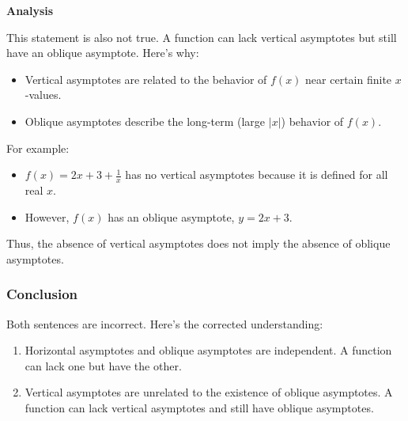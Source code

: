 \documentclass[a4paper,12pt]{article}
\begin{document}
\textbf{Analysis}

This statement is also not true. A function can lack vertical asymptotes but still have an oblique asymptote. Here’s why:
\begin{itemize}
\item 
Vertical asymptotes are related to the behavior of \( f(x) \) near certain finite \( x \)-values.

\item 
Oblique asymptotes describe the long-term (large \( |x| \)) behavior of \( f(x) \).

\end{itemize}

For example:
\begin{itemize}
\item 
\( f(x) = 2x + 3 + \frac{1}{x} \) has no vertical asymptotes because it is defined for all real \( x \).

\item 
However, \( f(x) \) has an oblique asymptote, \( y = 2x + 3 \).

\end{itemize}

Thus, the absence of vertical asymptotes does not imply the absence of oblique asymptotes.

\hrulefill

\subsubsection{Conclusion}

Both sentences are incorrect. Here's the corrected understanding:
\begin{enumerate}
\item 
Horizontal asymptotes and oblique asymptotes are independent. A function can lack one but have the other.

\item 
Vertical asymptotes are unrelated to the existence of oblique asymptotes. A function can lack vertical asymptotes and still have oblique asymptotes.

\end{enumerate}
\end{document}
